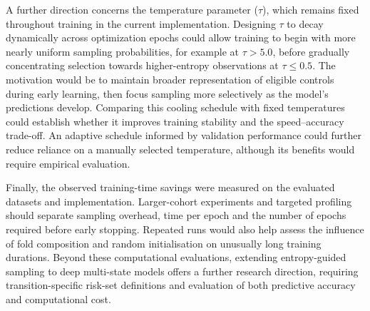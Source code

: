\documentclass[a4paper,twoside,12pt]{report}
\begin{document}
A further direction concerns the temperature parameter ($\tau$), which remains fixed throughout training in the current implementation. Designing $\tau$ to decay dynamically across optimization epochs could allow training to begin with more nearly uniform sampling probabilities, for example at $\tau > 5.0$, before gradually concentrating selection towards higher-entropy observations at $\tau \le 0.5$. The motivation would be to maintain broader representation of eligible controls during early learning, then focus sampling more selectively as the model's predictions develop. Comparing this cooling schedule with fixed temperatures could establish whether it improves training stability and the speed--accuracy trade-off. An adaptive schedule informed by validation performance could further reduce reliance on a manually selected temperature, although its benefits would require empirical evaluation.

Finally, the observed training-time savings were measured on the evaluated datasets and implementation. Larger-cohort experiments and targeted profiling should separate sampling overhead, time per epoch and the number of epochs required before early stopping. Repeated runs would also help assess the influence of fold composition and random initialisation on unusually long training durations. Beyond these computational evaluations, extending entropy-guided sampling to deep multi-state models offers a further research direction, requiring transition-specific risk-set definitions and evaluation of both predictive accuracy and computational cost.


\end{document}
